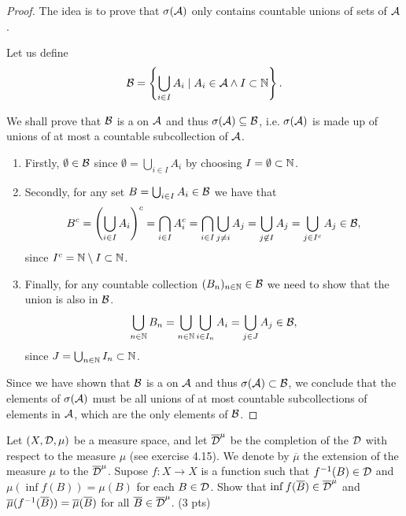 \begin{proof}
	The idea is to prove that $\sigma(\mathcal{A})$ only contains countable unions of sets of $\mathcal{A}$.
	
	Let us define
	\begin{align*}
		\mathcal{B} = \left\{\bigcup_{i \in I} A_i \mid A_i \in \mathcal{A} \land I \subset \mathbb{N}\right\}.
	\end{align*}
	
	We shall prove that $\mathcal{B}$ is a \siga on $\mathcal{A}$ and thus $\sigma (\mathcal{A}) \subseteq \mathcal{B}$, i.e. $\sigma(\mathcal{A})$ is made up of unions of at most a countable subcollection of $\mathcal{A}$.
	
	\begin{enumerate}
		\item Firstly, $\emptyset \in \mathcal{B}$ since $\emptyset = \bigcup_{i \in I} A_i$ by choosing $I = \emptyset \subset \mathbb{N}$.
		\item Secondly, for any set $B = \bigcup_{i \in I} A_i \in \mathcal{B}$ we have that
		\begin{align*}
			B^c = \left(\bigcup_{i \in I} A_i\right)^c = \bigcap_{i \in I} A_i^c = \bigcap_{i \in I} \bigcup_{j \neq i} A_j = \bigcup_{j \not\in I} A_j = \bigcup_{j \in I^c} A_j \in \mathcal{B},
		\end{align*}
		since $I^c = \mathbb{N} \setminus I \subset \mathbb{N}$.
		
		\item Finally, for any countable collection $(B_n)_{n \in \mathbb{N}} \in \mathcal{B}$ we need to show that the union is also in $\mathcal{B}$.
		\begin{align*}
			\bigcup_{n\in\mathbb{N}} B_n = \bigcup_{n\in\mathbb{N}} \bigcup_{i \in I_n} A_i = \bigcup_{j \in J} A_j \in \mathcal{B},
		\end{align*}
		since $J = \bigcup_{n \in \mathbb{N}} I_n \subset \mathbb{N}$.
	\end{enumerate}
	Since we have shown that $\mathcal{B}$ is a \siga on $\mathcal{A}$ and thus $\sigma(\mathcal{A}) \subset \mathcal{B}$, we conclude that the elements of $\sigma(\mathcal{A})$ must be all unions of at most countable subcollections of elements in $\mathcal{A}$, which are the only elements of $\mathcal{B}$.
\end{proof}

\begin{ex}
	Let $(X, \mathcal{D}, \mu)$ be a measure space, and let $\overline{\mathcal{D}}^\mu$ be the completion of the \siga $\mathcal{D}$ with respect to the measure $\mu$ (see exercise 4.15). We denote by $\overline{\mu}$ the extension of the measure $\mu$ to the \siga $\overline{\mathcal{D}}^\mu$. Supose $f: X \to X$ is a function such that ${f}^{-1}(B) \in \mathcal{D}$ and $\mu(\inf{f}(B)) = \mu(B)$ for each $B \in \mathcal{D}$. Show that $\inf{f}(\overline{B}) \in \overline{\mathcal{D}}^\mu$ and $\overline{\mu}({f}^{-1}(\overline{B})) = \overline{\mu}(\overline{B})$ for all $\overline{B} \in \overline{\mathcal{D}}^\mu$. (3 pts)
\end{ex}

